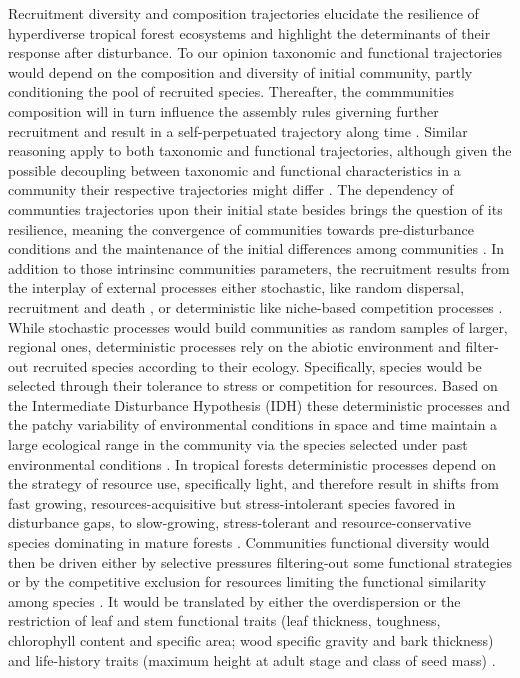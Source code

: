 \documentclass[fleqn,10pt]{ArtEcoFoG} %
\begin{document}
Recruitment diversity and composition trajectories elucidate the
resilience of hyperdiverse tropical forest ecosystems and highlight the
determinants of their response after disturbance. To our opinion
taxonomic and functional trajectories would depend on the composition
and diversity of initial community, partly conditioning the pool of
recruited species. Thereafter, the commmunities composition will in turn
influence the assembly rules giverning further recruitment and result in
a self-perpetuated trajectory along time \citep{Kunstler2016}. Similar
reasoning apply to both taxonomic and functional trajectories, although
given the possible decoupling between taxonomic and functional
characteristics in a community their respective trajectories might
differ \citep{Fukami2005}. The dependency of communties trajectories
upon their initial state besides brings the question of its resilience,
meaning the convergence of communities towards pre-disturbance
conditions and the maintenance of the initial differences among
communities \citep{Diaz2005, Gardner2007, Schwartz2017}. In addition to
those intrinsinc communities parameters, the recruitment results from
the interplay of external processes either stochastic, like random
dispersal, recruitment and death \citep{Hubbell2001}, or deterministic
like niche-based competition processes \citep{Adler2007}. While
stochastic processes would build communities as random samples of
larger, regional ones, deterministic processes rely on the abiotic
environment and filter-out recruited species according to their ecology.
Specifically, species would be selected through their tolerance to
stress or competition for resources. Based on the Intermediate
Disturbance Hypothesis (IDH) these deterministic processes and the
patchy variability of environmental conditions in space and time
maintain a large ecological range in the community via the species
selected under past environmental conditions \citep{Guitet2018}. In
tropical forests deterministic processes depend on the strategy of
resource use, specifically light, and therefore result in shifts from
fast growing, resources-acquisitive but stress-intolerant species
favored in disturbance gaps, to slow-growing, stress-tolerant and
resource-conservative species dominating in mature forests
\citep{Denslow1980, Molino2001, Bongers2009}. Communities functional
diversity would then be driven either by selective pressures
filtering-out some functional strategies or by the competitive exclusion
for resources limiting the functional similarity among species
\citep{Ackerly2003, McGill2006}. It would be translated by either the
overdispersion or the restriction of leaf and stem functional traits
(leaf thickness, toughness, chlorophyll content and specific area; wood
specific gravity and bark thickness) and life-history traits (maximum
height at adult stage and class of seed mass)
\citep{Wright2004, Chave2009b, Herault2011}.
\end{document}
